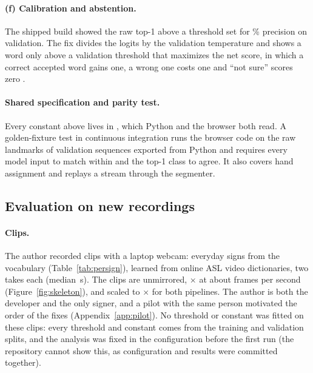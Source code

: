 \paragraph{(f) Calibration and abstention.} The shipped build showed the raw top-1 above a
threshold set for \% precision on validation. The fix divides the logits by the
validation temperature and shows a word only above a validation threshold that maximizes the net
score, in which a correct accepted word gains one, a wrong one costs one and ``not sure'' scores
zero \citep{guo2017calibration,geifman2017selective}.

\paragraph{Shared specification and parity test.} Every constant above lives in
, which Python and the browser both read. A golden-fixture test in
continuous integration runs the browser code on the raw landmarks of  validation
sequences exported from Python and requires every model input to match within  and the
top-1 class to agree. It also covers hand assignment and replays a stream through the segmenter.

\subsection{Evaluation on new recordings}

\paragraph{Clips.} The author recorded  clips with a laptop webcam: 
everyday signs from the vocabulary (Table~\ref{tab:persign}), learned from online ASL video
dictionaries, two takes each (median \,s). The clips are unmirrored,
$\times$ at about  frames per second
(Figure~\ref{fig:skeleton}), and scaled to $\times$ for both pipelines.
The author is both the developer and the only signer, and a pilot with the same person motivated
the order of the fixes (Appendix~\ref{app:pilot}). No threshold or constant was fitted on these
clips: every threshold and constant comes from the training and validation splits, and the analysis was fixed
in the configuration before the first run (the repository cannot show this, as configuration and
results were committed together).

